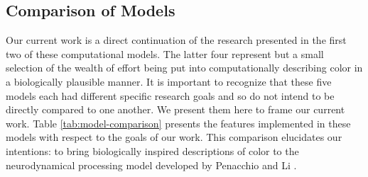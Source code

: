 \documentclass[journal,onecolumn]{IEEEtran}
\begin{document}
\subsection*{Comparison of Models}
Our current work is a direct continuation of the research presented in the first two of these computational models. The latter four represent but a small selection of the wealth of effort being put into computationally describing color in a biologically plausible manner. It is important to recognize that these five models each had different specific research goals and so do not intend to be directly compared to one another. We present them here to frame our current work. Table \ref{tab:model-comparison} presents the features implemented in these models with respect to the goals of our work. This comparison elucidates our intentions: to bring biologically inspired descriptions of color to the neurodynamical processing model developed by Penacchio \cite{penacchio:2013} and Li \cite{li:1999}.
\end{document}
